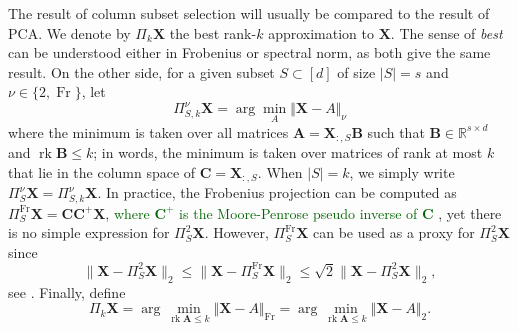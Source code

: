 \documentclass[twoside,11pt]{book}
\newcommand{\rev}[1]{\textcolor{darkgreen}{#1}}
\numberwithin{theorem}{chapter}
\numberwithin{definition}{chapter}
\numberwithin{proposition}{chapter}
\numberwithin{corollary}{chapter}
\numberwithin{example}{chapter}
\numberwithin{lemma}{chapter}
\DeclareMathOperator{\rank}{\mathrm{rk}}
\DeclareMathOperator{\Fr}{\mathrm{Fr}}
\begin{document}
The result of column subset selection will usually be compared to the result of PCA. We denote by $\Pi_k\bm{X}$ the best rank-$k$ approximation to $\bm{X}$. The sense of \emph{best} can be understood either in Frobenius or spectral norm, as both give the same result. On the other side, for a given subset $S \subset [d]$ of size $\vert S\vert=s$ and $\nu\in\{2,\Fr\}$, let
$$\Pi_{S,k}^{\nu}\bm{X} = \arg\min_{A} \Vert \bm{X}- A\Vert_{\nu}$$
where the minimum is taken over all matrices $\bm{A} = \bm{X}_{:,S}\bm{B}$ such that $\bm{B}\in\mathbb{R}^{s\times d}$ and $\rank \bm{B}\leq k$; in words, the minimum is taken over matrices of rank at most $k$ that lie in the column space of $\bm{C}=\bm{X}_{:,S}$. When $|S| = k$, we simply write $\Pi_{S}^{\nu}\bm{X} = \Pi_{S,k}^{\nu}\bm{X}$. In practice, the Frobenius projection can be computed as $\Pi_{S}^{\Fr}\bm{X} = \bm{C}\bm{C}^{+}\bm{X}$, \rev{where $\bm{C}^{+}$ is the Moore-Penrose pseudo inverse of $\bm{C}$} , yet there is no simple expression for $\Pi_{S}^{2}\bm{X}$. However, $\Pi_{S}^{\Fr}\bm{X}$ can be used as a proxy for $\Pi_{S}^{2}\bm{X}$ since
\begin{equation}\label{eq:frob_as_estimator_of_spe}
\|\bm{X} - \Pi_{S}^{2}\bm{X}\|_{2} \leq \|\bm{X} - \Pi_{S}^{\Fr}\bm{X}\|_{2}  \leq \sqrt{2} \|\bm{X} - \Pi_{S}^{2}\bm{X}\|_{2},
\end{equation}
see \cite[Lemma 2.3]{BoDrMI11}.
Finally, define
$$\Pi_{k}\bm{X} = \arg\min_{\rank \bm{A}\leq k} \Vert \bm{X}- A\Vert_{\Fr} = \arg\min_{\rank \bm{A}\leq k} \Vert \bm{X}- A\Vert_{2}.$$
\end{document}
